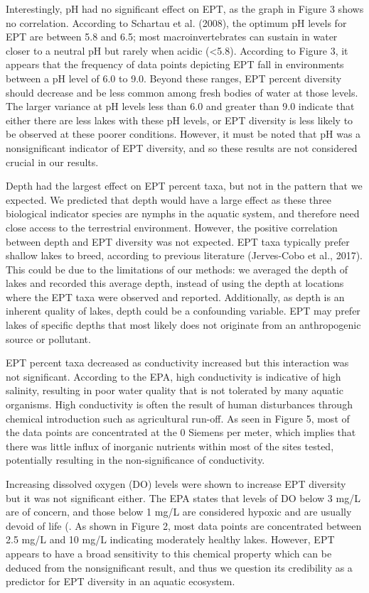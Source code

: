 \documentclass[]{article}
\begin{document}
Interestingly, pH had no significant effect on EPT, as the graph in
Figure 3 shows no correlation. According to Schartau et al. (2008), the
optimum pH levels for EPT are between 5.8 and 6.5; most
macroinvertebrates can sustain in water closer to a neutral pH but
rarely when acidic (\textless{}5.8). According to Figure 3, it appears
that the frequency of data points depicting EPT fall in environments
between a pH level of 6.0 to 9.0. Beyond these ranges, EPT percent
diversity should decrease and be less common among fresh bodies of water
at those levels. The larger variance at pH levels less than 6.0 and
greater than 9.0 indicate that either there are less lakes with these pH
levels, or EPT diversity is less likely to be observed at these poorer
conditions. However, it must be noted that pH was a nonsignificant
indicator of EPT diversity, and so these results are not considered
crucial in our results.

Depth had the largest effect on EPT percent taxa, but not in the pattern
that we expected. We predicted that depth would have a large effect as
these three biological indicator species are nymphs in the aquatic
system, and therefore need close access to the terrestrial environment.
However, the positive correlation between depth and EPT diversity was
not expected. EPT taxa typically prefer shallow lakes to breed,
according to previous literature (Jerves-Cobo et al., 2017). This could
be due to the limitations of our methods: we averaged the depth of lakes
and recorded this average depth, instead of using the depth at locations
where the EPT taxa were observed and reported. Additionally, as depth is
an inherent quality of lakes, depth could be a confounding variable. EPT
may prefer lakes of specific depths that most likely does not originate
from an anthropogenic source or pollutant.

EPT percent taxa decreased as conductivity increased but this
interaction was not significant. According to the EPA, high conductivity
is indicative of high salinity, resulting in poor water quality that is
not tolerated by many aquatic organisms. High conductivity is often the
result of human disturbances through chemical introduction such as
agricultural run-off. As seen in Figure 5, most of the data points are
concentrated at the 0 Siemens per meter, which implies that there was
little influx of inorganic nutrients within most of the sites tested,
potentially resulting in the non-significance of conductivity.

Increasing dissolved oxygen (DO) levels were shown to increase EPT
diversity but it was not significant either. The EPA states that levels
of DO below 3 mg/L are of concern, and those below 1 mg/L are considered
hypoxic and are usually devoid of life (. As shown in Figure 2, most
data points are concentrated between 2.5 mg/L and 10 mg/L indicating
moderately healthy lakes. However, EPT appears to have a broad
sensitivity to this chemical property which can be deduced from the
nonsignificant result, and thus we question its credibility as a
predictor for EPT diversity in an aquatic ecosystem.
\end{document}
